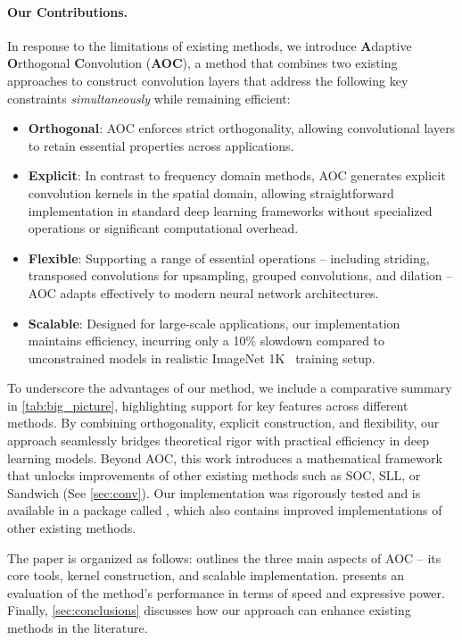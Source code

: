 \paragraph{Our Contributions.}
In response to the limitations of existing methods, we introduce \textbf{A}daptive \textbf{O}rthogonal \textbf{C}onvolution (\textbf{AOC}), a method that combines two existing approaches to construct convolution layers that address the following key constraints \textit{simultaneously} while remaining efficient:
\begin{itemize}[itemsep=7pt, topsep=5pt, parsep=0pt, partopsep=0pt]
    \item \textbf{Orthogonal}: AOC enforces strict orthogonality, allowing convolutional layers to retain essential properties across applications.     
    \item \textbf{Explicit}: In contrast to frequency domain methods, AOC generates explicit convolution kernels in the spatial domain, allowing straightforward implementation in standard deep learning frameworks without specialized operations or significant computational overhead. 
    \item \textbf{Flexible}: Supporting a range of essential operations -- including striding, transposed convolutions for upsampling, grouped convolutions, and dilation -- AOC adapts effectively to modern neural network architectures.
    \item \textbf{Scalable}: Designed for large-scale applications, our implementation maintains efficiency, incurring only a 10\% slowdown compared to unconstrained models in realistic ImageNet 1K~\cite{deng2009imagenet} training setup.
\end{itemize}
To underscore the advantages of our method, we include a comparative summary in  \cref{tab:big_picture}, highlighting support for key features across different methods.
By combining orthogonality, explicit construction, and flexibility, our approach seamlessly bridges theoretical rigor with practical efficiency in deep learning models. Beyond AOC, this work introduces a mathematical framework that unlocks improvements of other existing methods such as SOC, SLL, or Sandwich (See \cref{sec:conv}). Our implementation was rigorously tested and is available in a package called \fulllibname, which also contains improved implementations of other existing methods.


The paper is organized as follows:   outlines the three main aspects of AOC -- its core tools, kernel construction, and scalable implementation.  presents an evaluation of the method's performance in terms of speed and expressive power. Finally, \cref{sec:conclusions} discusses how our approach can enhance existing methods in the literature.

